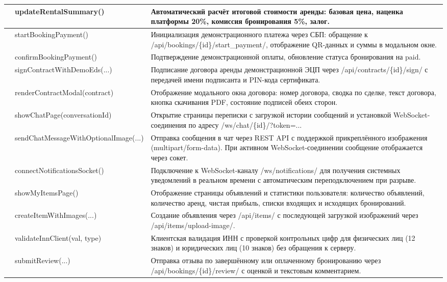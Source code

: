 \begin{xltabular}{\textwidth}{|c|X|X|}
	 & \leftrow updateRentalSummary() & \leftrow Автоматический расчёт итоговой стоимости аренды: базовая цена, наценка платформы 20\%, комиссия бронирования 5\%, залог. \\ \hline
	 & \leftrow startBookingPayment() & \leftrow Инициализация демонстрационного платежа через СБП: обращение к /api/bookings/\{id\}/start\_payment/, отображение QR-данных и суммы в модальном окне. \\ \hline
	 & \leftrow confirmBookingPayment() & \leftrow Подтверждение демонстрационной оплаты, обновление статуса бронирования на paid. \\ \hline
	 & \leftrow signContractWithDemoEds(...) & \leftrow Подписание договора аренды демонстрационной ЭЦП через /api/contracts/\{id\}/sign/ с передачей имени подписанта и PIN-кода сертификата. \\ \hline
	 & \leftrow renderContractModal(contract) & \leftrow Отображение модального окна договора: номер договора, сводка по сделке, текст договора, кнопка скачивания PDF, состояние подписей обеих сторон. \\ \hline
	 & \leftrow showChatPage(conversationId) & \leftrow Открытие страницы переписки с загрузкой истории сообщений и установкой WebSocket-соединения по адресу /ws/chat/\{id\}/?token=... \\ \hline
	 & \leftrow sendChatMessageWithOptionalImage(...) & \leftrow Отправка сообщения в чат через REST API с поддержкой прикреплённого изображения (multipart/form-data). При активном WebSocket-соединении сообщение отображается через сокет. \\ \hline
	 & \leftrow connectNotificationsSocket() & \leftrow Подключение к WebSocket-каналу /ws/notifications/ для получения системных уведомлений в реальном времени с автоматическим переподключением при разрыве. \\ \hline
	 & \leftrow showMyItemsPage() & \leftrow Отображение страницы объявлений и статистики пользователя: количество объявлений, количество аренд, чистая прибыль, списки входящих и исходящих бронирований. \\ \hline
	 & \leftrow createItemWithImages(...) & \leftrow Создание объявления через /api/items/ с последующей загрузкой изображений через /api/items/upload-image/. \\ \hline
	 & \leftrow validateInnClient(val, type) & \leftrow Клиентская валидация ИНН с проверкой контрольных цифр для физических лиц (12 знаков) и юридических лиц (10 знаков) без обращения к серверу. \\ \hline
	 & \leftrow submitReview(...) & \leftrow Отправка отзыва по завершённому или оплаченному бронированию через /api/bookings/\{id\}/review/ с оценкой и текстовым комментарием. \\ \hline
\end{xltabular}

